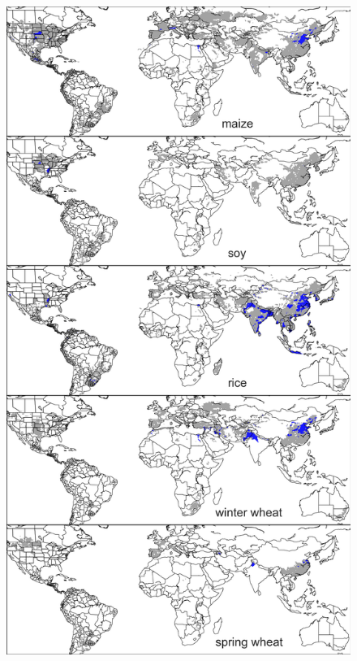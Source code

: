 \documentclass[10pt]{article}
\begin{document}

\clearpage

\renewcommand{\thefigure}{S\arabic{figure}}

\begin{figure}[h!]
\centering
\begin{minipage}{.45\textwidth}
    \centering
    \vspace{0pt}
    \includegraphics[width=\textwidth]{s_croparea_irr.png}\\

\end{minipage}
\end{figure}
\end{document}
